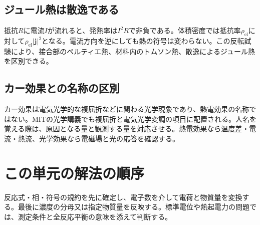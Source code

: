 \subsection{ジュール熱は散逸である}
\label{theory:electrochem:joule}
抵抗$R$に電流$I$が流れると、発熱率は$I^2R$で非負である。体積密度では抵抗率$\rho_{\mathrm{el}}$に対して$\rho_{\mathrm{el}}|\boldsymbol j|^2$となる。電流方向を逆にしても熱の符号は変わらない。この反転試験により、接合部のペルティエ熱、材料内のトムソン熱、散逸によるジュール熱を区別できる。

\subsection{カー効果との名称の区別}
\label{theory:electrochem:kerr}
カー効果は電気光学的な複屈折などに関わる光学現象であり、熱電効果の名称ではない。MITの光学講義でも複屈折と電気光学変調の項目に配置される\cite{mit_kerr_calendar2005}。人名を覚える際は、原因となる量と観測する量を対応させる。熱電効果なら温度差・電流・熱流、光学効果なら電磁場と光の応答を確認する。

\section{この単元の解法の順序}
反応式・相・符号の規約を先に確定し、電子数を介して電荷と物質量を変換する。最後に濃度の分母又は指定物質量を反映する。標準電位や熱起電力の問題では、測定条件と全反応平衡の意味を添えて判断する。
